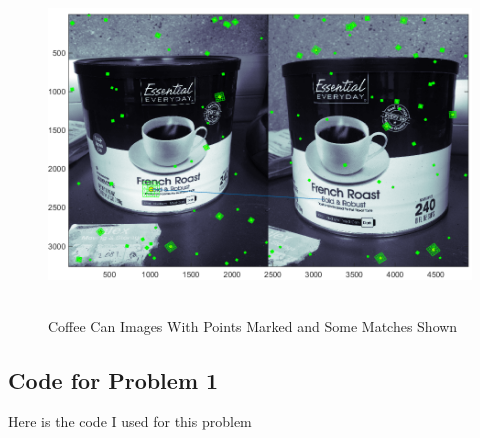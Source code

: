 \documentclass[11pt,psfig]{article}
\begin{document}
\begin{figure}[H]
\centering
\includegraphics[height=3.5in]{coffeeCan_pointsWithMatching.png}
\caption{Coffee Can Images With Points Marked and Some Matches Shown}
\label{cc3}
\end{figure}

\newpage

\subsection*{Code for Problem 1}

Here is the code I used for this problem


\end{document}
